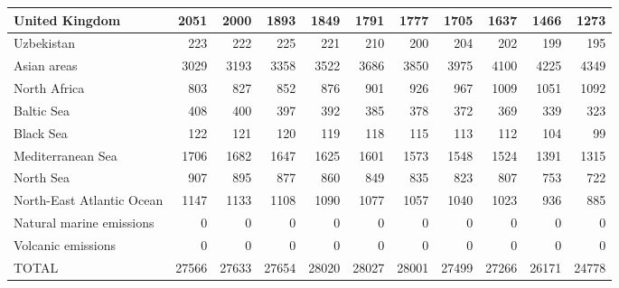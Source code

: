 \begin{table}
\begin{tabular}{|l|r|r|r|r|r|r|r|r|r|r|}
                United Kingdom&   2051&   2000&   1893&   1849&   1791&   1777&   1705&   1637&   1466&   1273\\\hline
                    Uzbekistan&    223&    222&    225&    221&    210&    200&    204&    202&    199&    195\\\hline
                   Asian areas&   3029&   3193&   3358&   3522&   3686&   3850&   3975&   4100&   4225&   4349\\\hline
                  North Africa&    803&    827&    852&    876&    901&    926&    967&   1009&   1051&   1092\\\hline
                    Baltic Sea&    408&    400&    397&    392&    385&    378&    372&    369&    339&    323\\\hline
                     Black Sea&    122&    121&    120&    119&    118&    115&    113&    112&    104&     99\\\hline
             Mediterranean Sea&   1706&   1682&   1647&   1625&   1601&   1573&   1548&   1524&   1391&   1315\\\hline
                     North Sea&    907&    895&    877&    860&    849&    835&    823&    807&    753&    722\\\hline
     North-East Atlantic Ocean&   1147&   1133&   1108&   1090&   1077&   1057&   1040&   1023&    936&    885\\\hline
      Natural marine emissions&      0&      0&      0&      0&      0&      0&      0&      0&      0&      0\\\hline
            Volcanic emissions&      0&      0&      0&      0&      0&      0&      0&      0&      0&      0\\\hline\hline
                         TOTAL&  27566&  27633&  27654&  28020&  28027&  28001&  27499&  27266&  26171&  24778\\\hline
 \end{tabular}
 \end{table}
 
